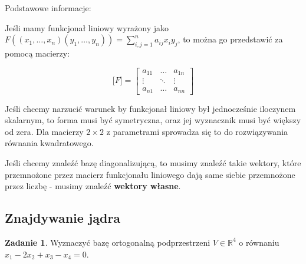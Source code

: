 \documentclass[11pt]{article}
\theoremstyle{definition}
\newtheorem{zadanie}{Zadanie}
\begin{document}


Podstawowe informacje:

Jeśli mamy funkcjonał liniowy wyrażony jako $F((x_1,\dots,x_n)(y_1,\dots,y_n)) = \sum_{i,j=1}^na_{ij}x_iy_j$, to można go przedstawić za pomocą macierzy:

$$\Big[F\Big] = \begin{bmatrix}
    a_{11} & \dots & a_{1n}\\
    \vdots & \ddots & \vdots\\
    a_{n1} & \dots & a_{nn}
    \end{bmatrix}$$

    Jeśli chcemy narzucić warunek by funkcjonał liniowy był jednocześnie iloczynem skalarnym, to forma musi być symetryczna, oraz jej wyznacznik musi być większy od zera. Dla macierzy $2\times2$ z parametrami sprowadza się to do rozwiązywania równania kwadratowego.

    Jeśli chcemy znaleźć bazę diagonalizującą, to musimy znaleźć takie wektory, które przemnożone przez macierz funkcjonału liniowego dają same siebie przemnożone przez liczbę - musimy znaleźć \textbf{wektory własne}.
\subsection{Znajdywanie jądra}

\begin{zadanie}
Wyznaczyć bazę ortogonalną podprzestrzeni $V\in \mathbb R^4$ o równaniu $x_1-2x_2+x_3-x_4=0$.
\end{zadanie}
\end{document}
